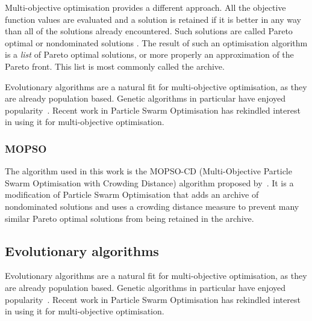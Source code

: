 Multi-objective optimisation provides a different approach.
All the objective function values are evaluated and a solution is retained if it is better in any way than all of the solutions already encountered.
Such solutions are called Pareto optimal or nondominated solutions \citep{steuer1986multiple}.
The result of such an optimisation algorithm is a \emph{list} of Pareto optimal solutions, or more properly an approximation of the Pareto front.
This list is most commonly called the archive.

Evolutionary algorithms are a natural fit for multi-objective optimisation, as they are already population based.
Genetic algorithms in particular have enjoyed popularity~\citep{deb.kalyanmoy2001multi-objective}.
Recent work in Particle Swarm Optimisation has rekindled interest in using it for multi-objective optimisation.


\subsubsection{MOPSO}\label{sec:mopso}
The algorithm used in this work is the MOPSO-CD (Multi-Objective Particle Swarm Optimisation with Crowding Distance) algorithm proposed by~\citet{raquel.naval2005effective}.
It is a modification of Particle Swarm Optimisation that adds an archive of nondominated solutions and uses a crowding distance measure to prevent many similar Pareto optimal solutions from being retained in the archive.


\subsection{Evolutionary algorithms}
Evolutionary algorithms are a natural fit for multi-objective optimisation, as they are already population based.
Genetic algorithms in particular have enjoyed popularity~\citep{deb.kalyanmoy2001multi-objective}.
Recent work in Particle Swarm Optimisation has rekindled interest in using it for multi-objective optimisation.


